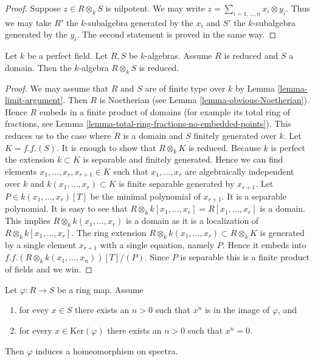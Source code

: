 \begin{proof}
Suppose $z \in R \otimes_k S$ is nilpotent. We may write
$z = \sum_{i = 1, \ldots, n} x_i \otimes y_i$.
Thus we may take $R'$ the $k$-subalgebra generated by
the $x_i$ and $S'$ the $k$-subalgebra generated by the $y_i$.
The second statement is proved in the same way.
\end{proof}

\begin{lemma}
\label{lemma-perfect-reduced}
Let $k$ be a perfect field. Let $R, S$ be $k$-algebras.
Assume $R$ is reduced and $S$ a domain.
Then the $k$-algebra $R \otimes_k S$ is reduced.
\end{lemma}

\begin{proof}
We may assume that $R$ and $S$ are of finite type over $k$
by Lemma \ref{lemma-limit-argument}.
Then $R$ is Noetherian (see Lemma \ref{lemma-obvious-Noetherian}).
Hence $R$ embeds in a finite product of domains
(for example its total ring of fractions, see
Lemma \ref{lemma-total-ring-fractions-no-embedded-points}).
This reduces us to the case where $R$ is a domain
and $S$ finitely generated over $k$.
Let $K = f.f.(S)$. It is enough to show that $R \otimes_k K$
is reduced. Because $k$ is perfect the extension
$k \subset K$ is separable and finitely generated.
Hence we can find elements $x_1, \ldots, x_r, x_{r + 1} \in K$ such that
$x_1, \ldots, x_r$ are algebraically independent over
$k$ and $k(x_1, \ldots, x_r) \subset K$ is finite separable
generated by $x_{r + 1}$. Let $P \in k(x_1, \ldots, x_r)[T]$
be the minimal polynomial of $x_{r + 1}$. It is a separable polynomial.
It is easy to see that
$R \otimes_k k[x_1, \ldots, x_r] = R[x_1, \ldots, x_r]$ is a domain.
This implies $R \otimes_k k(x_1, \ldots, x_r)$ is a domain
as it is a localization of $R \otimes_k k[x_1, \ldots, x_r]$.
The ring extension $R \otimes_k k(x_1, \ldots, x_r) \subset R \otimes_k K$
is generated by a single element $x_{r + 1}$ with a single
equation, namely $P$. Hence it embeds into
$f.f.(R \otimes_k k(x_1, \ldots, x_n))[T]/(P)$.
Since $P$ is separable this is a finite product of fields and we win.
\end{proof}

\begin{lemma}
\label{lemma-p-ring-map}
Let $\varphi : R \to S$ be a ring map. Assume
\begin{enumerate}
\item for evey $x \in S$ there exists an $n > 0$ such that
$x^n$ is in the image of $\varphi$, and
\item for every $x \in \text{Ker}(\varphi)$ there exists
an $n > 0$ such that $x^n = 0$.
\end{enumerate}
Then $\varphi$ induces a homeomorphism on spectra.
\end{lemma}

